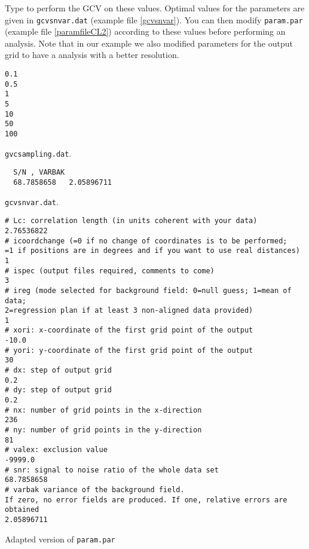 Type  to perform the GCV on these values. Optimal values for the parameters are given in \texttt{gcvsnvar.dat} (example file \ref{gcvsnvar}). You can then modify \texttt{param.par} (example file \ref{paramfileCL2}) according to these values before performing an analysis. Note that in our example we also modified parameters for the output grid to have a analysis with a better resolution.


\begin{exfile}[H]
\begin{footnotesize}
\begin{verbatim}
0.1
0.5
1
5
10
50
100
\end{verbatim}
\end{footnotesize}
\caption{\texttt{gvcsampling.dat}. \label{gcvsampling}}
\end{exfile}


\begin{exfile}[H]
\begin{footnotesize}
\begin{verbatim}
  S/N , VARBAK
  68.7858658   2.05896711
\end{verbatim}
\end{footnotesize}
\caption{\texttt{gcvsnvar.dat}. \label{gcvsnvar}}
\end{exfile}



\begin{exfile}[htpb]
\begin{footnotesize}
\begin{verbatim}
# Lc: correlation length (in units coherent with your data)
2.76536822
# icoordchange (=0 if no change of coordinates is to be performed; 
=1 if positions are in degrees and if you want to use real distances)
1
# ispec (output files required, comments to come)
3
# ireg (mode selected for background field: 0=null guess; 1=mean of data; 
2=regression plan if at least 3 non-aligned data provided)
1
# xori: x-coordinate of the first grid point of the output
-10.0
# yori: y-coordinate of the first grid point of the output
30
# dx: step of output grid
0.2
# dy: step of output grid
0.2
# nx: number of grid points in the x-direction
236
# ny: number of grid points in the y-direction
81
# valex: exclusion value
-9999.0
# snr: signal to noise ratio of the whole data set
68.7858658   
# varbak variance of the background field. 
If zero, no error fields are produced. If one, relative errors are obtained
2.05896711
\end{verbatim}
\end{footnotesize}
\caption{Adapted version of \texttt{param.par}\label{paramfileCL2}}
\end{exfile}

